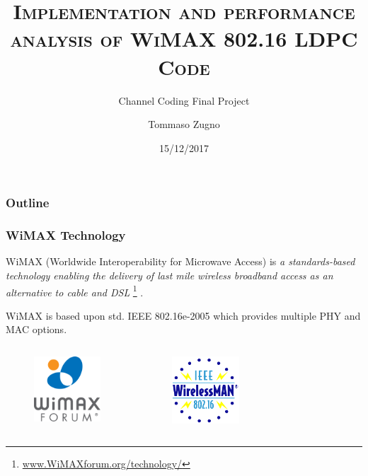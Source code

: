 \documentclass[]{beamer}
\title[]{\textsc{Implementation and performance analysis of WiMAX 802.16 LDPC Code}}
\subtitle[]{Channel Coding Final Project}
\author[]{Tommaso Zugno}
\date[]{15/12/2017}
\begin{document}
\frame{\titlepage} %
\section{   }

\begin{frame}
\transwipe[direction=0]
\frametitle{Outline}

\end{frame}


\begin{frame}
\transwipe[direction=0]
\frametitle{WiMAX Technology}
WiMAX (Worldwide Interoperability for Microwave Access) is \textit{a standards-based technology enabling the delivery of last mile wireless broadband access as an alternative to cable and DSL} \footnote{\url{www.WiMAXforum.org/technology/}} .

\vspace{0.3cm}
WiMAX is based upon std. IEEE 802.16e-2005 which provides multiple PHY and MAC options.

\begin{columns}
			\begin{figure}
				\centering
					\includegraphics[width=2.5cm]{figure1/WiMAX}
			\end{figure}
			\begin{figure}
				\centering
					\includegraphics[width=2.5cm]{figure1/wirelessman}
			\end{figure}
	\end{columns}
\centering
\end{frame}
\end{document}

